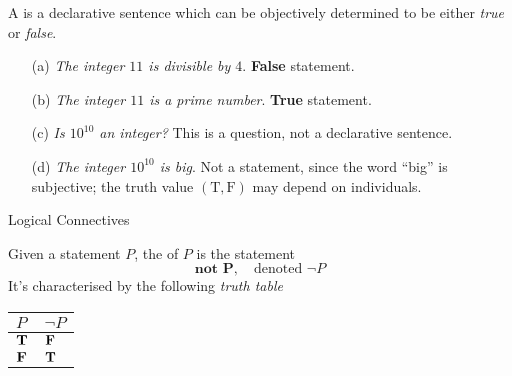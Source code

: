 \vspace*{1em}

\begin{definition}[Statement]
A  is a declarative sentence which can be objectively determined to be either \emph{true} or \emph{false}.
\end{definition}


\begin{example}\hfill
\begin{itemize}
\item[(a)] \emph{The integer $11$ is divisible by $4$}. {\bf False} statement.
\item[(b)] \emph{The integer $11$ is a prime number}. {\bf True} statement.
\item[(c)] \emph{Is $10^{10}$ an integer?} This is a question, not a declarative sentence.
\item[(d)] \emph{The integer $10^{10}$ is big}. Not a statement, since the word ``big'' is subjective; the truth value $(\text{T},\text{F})$ may depend on individuals.
\end{itemize}
\end{example}

\vspace*{2em}

\begin{mdframed}
\begin{center}
{\Large Logical Connectives}
\end{center}
\end{mdframed}

\begin{definition}[Negation]
Given a statement $P$, the  of $P$ is the statement \[\textbf{not $\mathbold{P}$},\quad \text{denoted $\neg P$}\]
It's characterised by the following \emph{truth table}
\begin{center}
{\renewcommand{\arraystretch}{1.5}%
\begin{tabular}{|>{\centering}m{1cm}|>{\centering\arraybackslash}m{1cm}|}
\hline
\rowcolor{lightgrey}
$P$ & $\neg P$\\
\hline
$\mathbf{T}$ & $\mathbf{F}$\\
\hline
$\mathbf{F}$ & $\mathbf{T}$\\
\hline
\end{tabular}
}
\end{center}
\end{definition}

